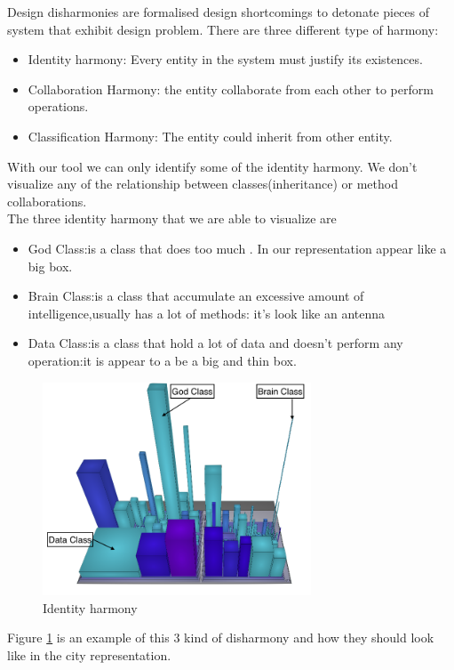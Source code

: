 \documentclass[]{usiinfbachelorproject}
\begin{document}
Design disharmonies are formalised design shortcomings to detonate pieces of system that exhibit design problem\cite{Disharmony}. 
There are three different type of harmony:
\begin{itemize}
\item Identity harmony: Every entity in the system must justify its existences.
\item Collaboration Harmony:  the entity collaborate from each other to perform operations.
\item Classification Harmony: The entity could inherit from other entity. 
\end{itemize} 
With our tool we can only identify some of the identity harmony. We don't visualize any of the relationship between classes(inheritance) or method collaborations.\\
The three identity harmony that we are able to visualize are
\begin{itemize}
\item{God Class}:is a class that does too much . In our representation appear like a big box.
\item{Brain Class}:is a class that accumulate an excessive amount of intelligence,usually has a lot of methods: it's look like an antenna
\item{Data Class}:is a class that hold a lot of data and doesn't perform any operation:it is appear to a be a big and thin box.

\end{itemize} 
\begin{figure}[h]
	\centering
\includegraphics[width=8cm]{images/disharmony}

\caption{Identity harmony\label {fig:harmony}}
\end{figure}

Figure \ref{fig:harmony} is an example of this 3 kind of disharmony and how they should look like in the city representation.
\end{document}

